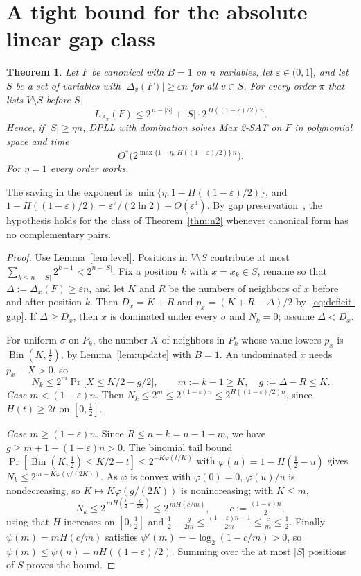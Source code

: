 \documentclass[11pt,a4paper]{article}
\newtheorem{theorem}{Theorem}
\theoremstyle{remark}
\newcommand{\Ostar}{O^{*}}
\begin{document}
\section{A tight bound for the absolute linear gap class}

\begin{theorem}\label{thm:tight}
Let $F$ be canonical with $B=1$ on $n$ variables, let $\varepsilon\in(0,1]$,
and let $S$ be a set of variables with $|\Delta_v(F)|\ge\varepsilon n$ for all
$v\in S$. For every order $\pi$ that lists $V\setminus S$ before $S$,
\[
 L_{A_\pi}(F)\le2^{\,n-|S|}+|S|\cdot2^{\,H((1-\varepsilon)/2)\,n}.
\]
Hence, if $|S|\ge\eta n$, DPLL with domination solves Max 2-SAT on $F$ in
polynomial space and time
\[
 \Ostar\bigl(2^{\max\{1-\eta,\,H((1-\varepsilon)/2)\}\,n}\bigr).
\]
For $\eta=1$ every order works.
\end{theorem}

The saving in the exponent is $\min\{\eta,1-H((1-\varepsilon)/2)\}$, and
$1-H((1-\varepsilon)/2)=\varepsilon^2/(2\ln2)+O(\varepsilon^4)$. By gap
preservation~\cite[Lemma~3]{N2}, the hypothesis holds for the class of
Theorem~\ref{thm:n2} whenever canonical form has no complementary pairs.

\begin{proof}
Use Lemma~\ref{lem:level}. Positions in $V\setminus S$ contribute at most
$\sum_{k\le n-|S|}2^{k-1}<2^{n-|S|}$. Fix a position $k$ with $x=x_k\in S$,
rename so that $\Delta:=\Delta_x(F)\ge\varepsilon n$, and let $K$ and $R$ be
the numbers of neighbors of $x$ before and after position $k$. Then
$D_x=K+R$ and $p_x=(K+R-\Delta)/2$ by~\eqref{eq:deficit-gap}. If
$\Delta\ge D_x$, then $x$ is dominated under every $\sigma$ and $N_k=0$; assume
$\Delta<D_x$.

For uniform $\sigma$ on $P_k$, the number $X$ of neighbors in $P_k$ whose
value lowers $p_x$ is $\operatorname{Bin}(K,\tfrac12)$, by
Lemma~\ref{lem:update} with $B=1$. An undominated $x$ needs $p_x-X>0$, so
\[
 N_k\le2^{m}\Pr\bigl[X\le K/2-g/2\bigr],\qquad m:=k-1\ge K,\quad g:=\Delta-R\le K.
\]
\emph{Case $m<(1-\varepsilon)n$.} Then $N_k\le2^m\le2^{(1-\varepsilon)n}\le
2^{H((1-\varepsilon)/2)n}$, since $H(t)\ge2t$ on $[0,\tfrac12]$.

\emph{Case $m\ge(1-\varepsilon)n$.} Since $R\le n-k=n-1-m$, we have
$g\ge m+1-(1-\varepsilon)n>0$. The binomial tail bound
$\Pr[\operatorname{Bin}(K,\tfrac12)\le K/2-t]\le2^{-K\varphi(t/K)}$ with
$\varphi(u)=1-H(\tfrac12-u)$ gives $N_k\le2^{m-K\varphi(g/(2K))}$. As
$\varphi$ is convex with $\varphi(0)=0$, $\varphi(u)/u$ is nondecreasing, so
$K\mapsto K\varphi(g/(2K))$ is nonincreasing; with $K\le m$,
\[
 N_k\le2^{\,mH(\frac12-\frac g{2m})}\le2^{\,mH(c/m)},\qquad
 c:=\tfrac{(1-\varepsilon)n}{2},
\]
using that $H$ increases on $[0,\tfrac12]$ and
$\tfrac12-\tfrac g{2m}\le\tfrac{(1-\varepsilon)n-1}{2m}\le\tfrac cm\le\tfrac12$.
Finally $\psi(m)=mH(c/m)$ satisfies $\psi'(m)=-\log_2(1-c/m)>0$, so
$\psi(m)\le\psi(n)=nH((1-\varepsilon)/2)$. Summing over the at most $|S|$
positions of $S$ proves the bound.
\end{proof}
\end{document}
